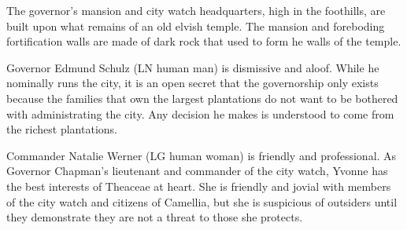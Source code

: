 The governor's mansion and city watch headquarters, high in the foothills, are built upon what remains of an old elvish temple.
The mansion and foreboding fortification walls are made of dark rock that used to form he walls of the temple.

Governor Edmund Schulz (LN human man) is dismissive and aloof.
While he nominally runs the city, it is an open secret that the governorship only exists because the families that own the largest plantations do not want to be bothered with administrating the city.
Any decision he makes is understood to come from the richest plantations.

Commander Natalie Werner (LG human woman) is friendly and professional.
As Governor Chapman's lieutenant and commander of the city watch, Yvonne has the best interests of Theaceae at heart.
She is friendly and jovial with members of the city watch and citizens of Camellia, but she is suspicious of outsiders until they demonstrate they are not a threat to those she protects.
